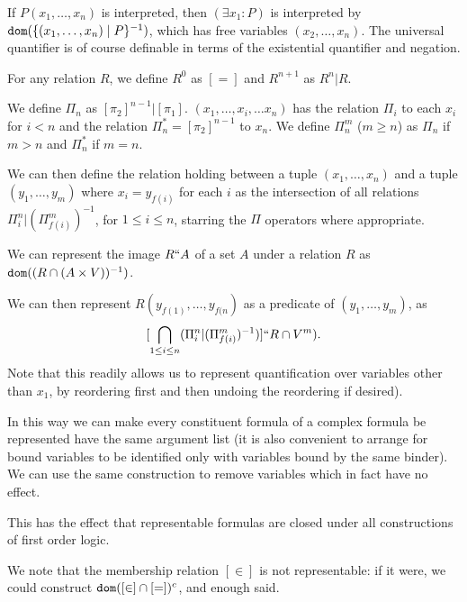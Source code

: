 \documentclass{slides}
\begin{document}
\begin{slide}

If $P(x_1,\ldots,x_n)$ is interpreted, then $(\exists x_1: P)$ is interpreted by ${\tt dom}(\{(x_1,\ldots,x_n)\mid P\}^{-1})$, which has free variables $(x_2,\ldots,x_n)$.  The universal quantifier is of course definable in terms of the existential quantifier and negation.

\end{slide}


\begin{slide}

For any relation $R$, we define $R^0$ as $[=]$ and $R^{n+1}$ as $R^n|R$.

We define $\Pi_n$ as $[\pi_2]^{n-1}|[\pi_1]$.  $(x_1,\ldots,x_i,\ldots x_n)$ has the relation $\Pi_i$ to each $x_i$ for $i<n$
and the relation $\Pi_n^* = [\pi_2]^{n-1}$ to $x_n$.  We define $\Pi^m_n$ ($m \geq n$) as $\Pi_n$ if $m>n$ and $\Pi^*_n$ if $m=n$.

We can then define the relation holding between a tuple $(x_1,\ldots,x_n)$ and a tuple $(y_1,\dots,y_m)$
where $x_i = y_{f(i)}$ for each $i$ as the intersection of all relations $\Pi^n_i|(\Pi^m_{f(i)})^{-1}$, for $1 \leq i \leq n$, starring the $\Pi$ operators where appropriate. 

We can represent the image $R``A$ of a set $A$ under a relation $R$ as ${\tt dom}((R \cap (A\times V))^{-1})$.

\end{slide}

\begin{slide}

We can then represent $R(y_{f(1)},\ldots,y_{f(n})$ as a predicate of $(y_1,\ldots,y_m)$, as $$[\bigcap_{1 \leq i\leq n}(\Pi^n_i|(\Pi^m_{f(i)})^{-1})]``R \cap V^m).$$
 Note that this readily allows us to represent quantification over variables other than $x_1$, by reordering first and then undoing the reordering if desired).

In this way we can make every constituent formula of a complex formula be represented have the same argument list (it is also convenient to arrange for bound variables to be identified only with variables bound by the same binder).  We can use the same construction to remove variables which in fact have no effect.

This has the effect that representable formulas are closed under all constructions of first order logic.

We note that the membership relation $[\in]$ is not representable:  if it
were, we could construct ${\tt dom}([\in] \cap [=])^c$, and enough said.
\end{slide}
\end{document}

